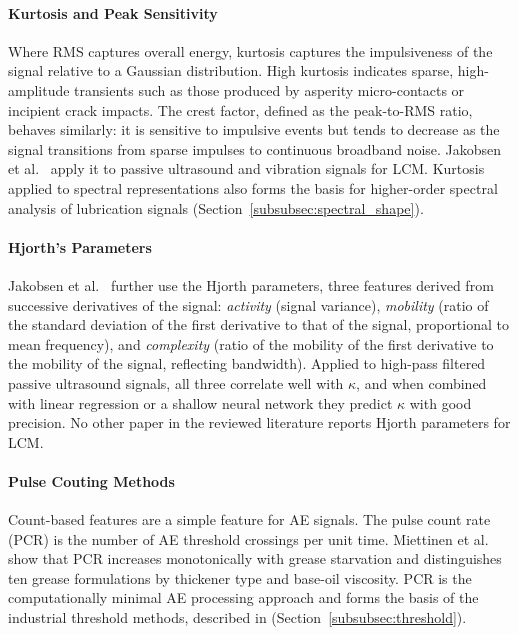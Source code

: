 \paragraph{Kurtosis and Peak Sensitivity}
Where RMS captures overall energy, kurtosis captures the impulsiveness of the signal relative to a Gaussian distribution. High kurtosis indicates sparse, high-amplitude transients such as those produced by asperity micro-contacts or incipient crack impacts. The crest factor, defined as the peak-to-RMS ratio, behaves similarly: it is sensitive to impulsive events but tends to decrease as the signal transitions from sparse impulses to continuous broadband noise. Jakobsen et al.\ \cite{jakobsen_detecting_2023} apply it to passive ultrasound and vibration signals for LCM. Kurtosis applied to spectral representations also forms the basis for higher-order spectral analysis of lubrication signals (Section~\ref{subsubsec:spectral_shape}).

\paragraph{Hjorth's Parameters}
Jakobsen et al.\ \cite{jakobsen_detecting_2023} further use the Hjorth parameters, three features derived from successive derivatives of the signal: \textit{activity} (signal variance), \textit{mobility} (ratio of the standard deviation of the first derivative to that of the signal, proportional to mean frequency), and \textit{complexity} (ratio of the mobility of the first derivative to the mobility of the signal, reflecting bandwidth). Applied to high-pass filtered passive ultrasound signals, all three correlate well with $\kappa$, and when combined with linear regression or a shallow neural network they predict $\kappa$ with good precision. No other paper in the reviewed literature reports Hjorth parameters for LCM.

\paragraph{Pulse Couting Methods}
Count-based features are a simple feature for AE signals. The pulse count rate (PCR) is the number of AE threshold crossings per unit time. Miettinen et al.\ \cite{miettinen_analysis_2001} show that PCR increases monotonically with grease starvation and distinguishes ten grease formulations by thickener type and base-oil viscosity. PCR is the computationally minimal AE processing approach and forms the basis of the industrial threshold methods, described in (Section~\ref{subsubsec:threshold}).

